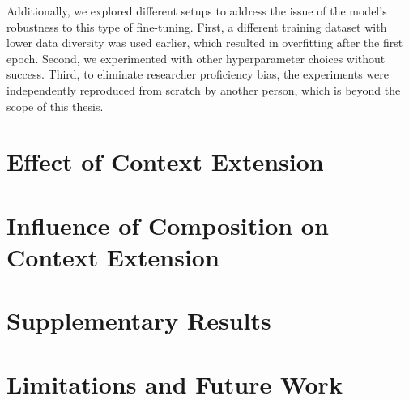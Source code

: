 Additionally, we explored different setups to address the issue of the model's robustness to this type of fine-tuning. First, a different training dataset with lower data diversity was used earlier, which resulted in overfitting after the first epoch. Second, we experimented with other hyperparameter choices without success. Third, to eliminate researcher proficiency bias, the experiments were independently reproduced from scratch by another person, which is beyond the scope of this thesis.

\section{Effect of Context Extension}\label{sec:effect-of-context-extension}

\section{Influence of Composition on Context Extension}\label{sec:influence-of-composition-on-context-extension}

\section{Supplementary Results}

\section{Limitations and Future Work}

